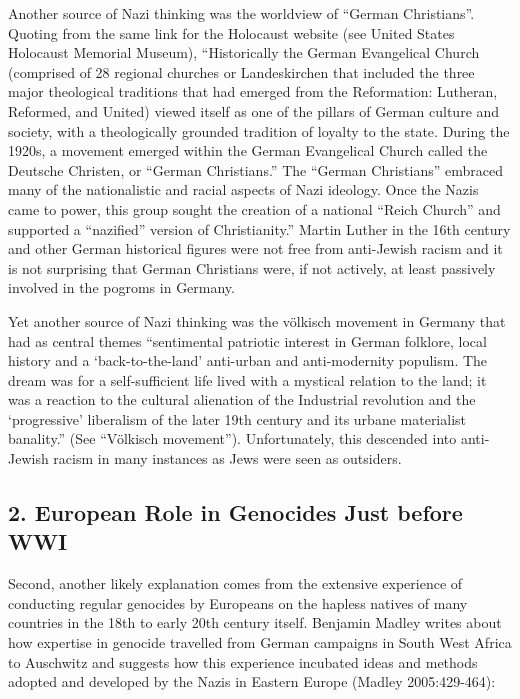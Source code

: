 Another source of Nazi thinking was the worldview of “German Christians”. Quoting from the same link for the Holocaust website (see United States Holocaust Memorial Museum), “Historically the German Evangelical Church (comprised of 28 regional churches or Landeskirchen that included the three major theological traditions that had emerged from the Reformation: Lutheran, Reformed, and United) viewed itself as one of the pillars of German culture and society, with a theologically grounded tradition of loyalty to the state. During the 1920s, a movement emerged within the German Evangelical Church called the Deutsche Christen, or “German Christians.” The “German Christians” embraced many of the nationalistic and racial aspects of Nazi ideology. Once the Nazis came to power, this group sought the creation of a national “Reich Church” and supported a “nazified” version of Christianity.” Martin Luther in the 16th century and other German historical figures were not free from anti-Jewish racism and it is not surprising that German Christians were, if not actively, at least passively involved in the pogroms in Germany.

Yet another source of Nazi thinking was the völkisch movement in Germany that had as central themes “sentimental patriotic interest in German folklore, local history and a ‘back-to-the-land’ anti-urban and anti-modernity populism. The dream was for a self-sufficient life lived with a mystical relation to the land; it was a reaction to the cultural alienation of the Industrial revolution and the ‘progressive’ liberalism of the later 19th century and its urbane materialist banality.” (See “Völkisch movement”). Unfortunately, this descended into anti-Jewish racism in many instances as Jews were seen as outsiders.

\subsection*{2. European Role in Genocides Just before WWI}

Second, another likely explanation comes from the extensive experience of conducting regular genocides by Europeans on the hapless natives of many countries in the 18th to early 20th century itself. Benjamin Madley writes about how expertise in genocide travelled from German campaigns in South West Africa to Auschwitz and suggests how this experience incubated ideas and methods adopted and developed by the Nazis in Eastern Europe (Madley 2005:429-464):


